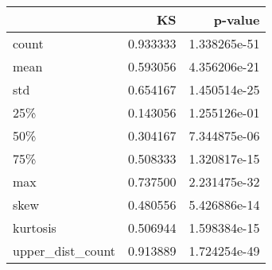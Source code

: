 \begin{tabular}{lrr}
\toprule
{} &        KS &       p-value \\
\midrule
count            &  0.933333 &  1.338265e-51 \\
mean             &  0.593056 &  4.356206e-21 \\
std              &  0.654167 &  1.450514e-25 \\
25\%              &  0.143056 &  1.255126e-01 \\
50\%              &  0.304167 &  7.344875e-06 \\
75\%              &  0.508333 &  1.320817e-15 \\
max              &  0.737500 &  2.231475e-32 \\
skew             &  0.480556 &  5.426886e-14 \\
kurtosis         &  0.506944 &  1.598384e-15 \\
upper\_dist\_count &  0.913889 &  1.724254e-49 \\
\bottomrule
\end{tabular}
